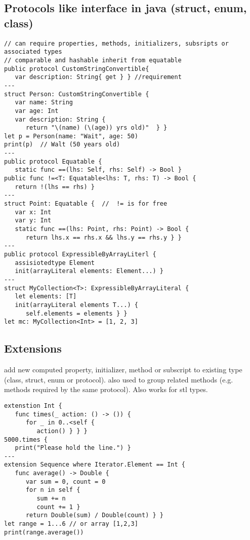 \subsection{Protocols like interface in java (struct, enum, class)}
\begin{lstlisting}
// can require properties, methods, initializers, subsripts or associated types
// comparable and hashable inherit from equatable
public protocol CustomStringConvertible{
   var description: String{ get } } //requirement
---
struct Person: CustomStringConvertible {
   var name: String
   var age: Int
   var description: String {
      return "\(name) (\(age)) yrs old)"  } }
let p = Person(name: "Wait", age: 50)
print(p)  // Walt (50 years old)
---
public protocol Equatable {
   static func ==(lhs: Self, rhs: Self) -> Bool }
public func !=<T: Equatable<lhs: T, rhs: T) -> Bool {
   return !(lhs == rhs) }
---
struct Point: Equatable {  //  != is for free
   var x: Int
   var y: Int
   static func ==(lhs: Point, rhs: Point) -> Bool {
      return lhs.x == rhs.x && lhs.y == rhs.y } }
---
public protocol ExpressibleByArrayLiterl {
   assisiotedtype Element
   init(arrayLiteral elements: Element...) }
---
struct MyCollection<T>: ExpressibleByArrayLiteral {
   let elements: [T]
   init(arrayLiteral elements T...) {
      self.elements = elements } }
let mc: MyCollection<Int> = [1, 2, 3]
\end{lstlisting}

\subsection{Extensions}
add new computed property, initializer, method or subscript to existing type (class, struct, enum or protocol). also used to group related methods (e.g. methods required by the same protocol). Also works for stl types.
\begin{lstlisting}
extenstion Int {
   func times(_ action: () -> ()) {
      for _ in 0..<self {
         action() } } }
5000.times {
   print("Please hold the line.") }
---
extension Sequence where Iterator.Element == Int {
   func average() -> Double {
      var sum = 0, count = 0
      for n in self {
         sum += n
         count += 1 }
      return Double(sum) / Double(count) } }
let range = 1...6 // or array [1,2,3]
print(range.average())
\end{lstlisting}

